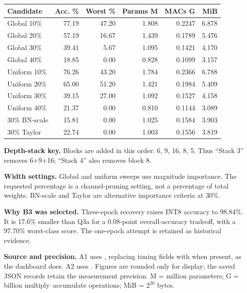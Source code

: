 \noindent\begin{minipage}[t]{0.49\textwidth}\vspace{0pt}\centering\fontsize{8.5}{10}\selectfont\setlength{\tabcolsep}{2.3pt}\renewcommand{\arraystretch}{1.16}
\begin{tabular*}{\linewidth}{@{\extracolsep{\fill}}lrrrrr@{}}\toprule
\rowcolor{slate}\textbf{Candidate} & \textbf{Acc. \%} & \textbf{Worst \%} & \textbf{Params M} & \textbf{MACs G} & \textbf{MiB}\\\midrule
Global 10\% & 77.19 & 47.20 & 1.808 & 0.2247 & 6.878\\
Global 20\% & 57.19 & 16.67 & 1.439 & 0.1789 & 5.476\\
Global 30\% & 39.41 & 5.67 & 1.095 & 0.1421 & 4.170\\
Global 40\% & 18.85 & 0.00 & 0.828 & 0.1099 & 3.157\\
Uniform 10\% & 76.26 & 43.20 & 1.784 & 0.2366 & 6.788\\
Uniform 20\% & 65.00 & 51.20 & 1.421 & 0.1984 & 5.409\\
Uniform 30\% & 39.15 & 27.00 & 1.092 & 0.1527 & 4.158\\
Uniform 40\% & 21.37 & 0.00 & 0.810 & 0.1144 & 3.089\\
30\% BN-scale & 15.81 & 0.00 & 1.025 & 0.1584 & 3.903\\
30\% Taylor & 22.74 & 0.00 & 1.003 & 0.1556 & 3.819\\
\bottomrule\end{tabular*}
\par\vspace{8pt}\raggedright\footnotesize
\textbf{Depth-stack key.} Blocks are added in this order: 6, 9, 16, 8, 5. Thus ``Stack 3'' removes 6+9+16; ``Stack 4'' also removes block 8.

\vspace{5pt}\textbf{Width settings.} Global and uniform sweeps use magnitude importance. The requested percentage is a channel-pruning setting, not a percentage of total weights. BN-scale and Taylor are alternative importance criteria at 30\%.

\vspace{5pt}\textbf{Why B3 was selected.} Three-epoch recovery raises INT8 accuracy to 98.84\%. It is 17.6\% smaller than Q3a for a 0.08-point overall-accuracy tradeoff, with a 97.70\% worst-class score. The one-epoch attempt is retained as historical evidence.
\end{minipage}
\par\vspace{8pt}
\noindent\footnotesize\textbf{Source and precision.} A1 uses , replacing timing fields with  when present, as the dashboard does. A2 uses . Figures are rounded only for display; the saved JSON records retain the measurement precision. M = million parameters; G = billion multiply--accumulate operations; MiB = $2^{20}$ bytes.

